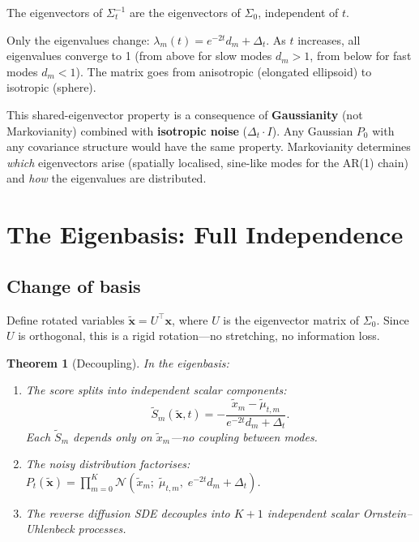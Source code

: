 \documentclass[11pt,a4paper]{article}
\newtheorem{theorem}{Theorem}[section]
\theoremstyle{definition}
\newcommand{\Dt}{\Delta_t}
\begin{document}
\begin{keybox}
The eigenvectors of $\Sigma_t^{-1}$ are the eigenvectors of $\Sigma_0$, independent of $t$.

Only the eigenvalues change: $\lambda_m(t) = e^{-2t}d_m + \Dt$.
As $t$ increases, all eigenvalues converge to 1 (from above for slow modes $d_m > 1$, from below for fast modes $d_m < 1$).
The matrix goes from anisotropic (elongated ellipsoid) to isotropic (sphere).

This shared-eigenvector property is a consequence of \textbf{Gaussianity} (not Markovianity) combined with \textbf{isotropic noise} ($\Dt\cdot I$).
Any Gaussian $P_0$ with any covariance structure would have the same property.
Markovianity determines \emph{which} eigenvectors arise (spatially localised, sine-like modes for the AR(1) chain) and \emph{how} the eigenvalues are distributed.
\end{keybox}


\section{The Eigenbasis: Full Independence}
\label{sec:eigenbasis}

\subsection{Change of basis}

Define rotated variables $\tilde{\mathbf{x}} = U^\top\mathbf{x}$, where $U$ is the eigenvector matrix of $\Sigma_0$.
Since $U$ is orthogonal, this is a rigid rotation---no stretching, no information loss.

\begin{theorem}[Decoupling]\label{thm:decouple}
In the eigenbasis:
\begin{enumerate}[label=(\roman*), nosep]
  \item The score splits into independent scalar components:
  \begin{equation}\label{eq:score-rot}
    \tilde{S}_m(\tilde{\mathbf{x}},t) = -\frac{\tilde{x}_m - \tilde{\mu}_{t,m}}{e^{-2t}d_m + \Dt}.
  \end{equation}
  Each $\tilde{S}_m$ depends only on $\tilde{x}_m$---no coupling between modes.
  \item The noisy distribution factorises: $P_t(\tilde{\mathbf{x}}) = \prod_{m=0}^K\mathcal{N}(\tilde{x}_m;\;\tilde{\mu}_{t,m},\;e^{-2t}d_m + \Dt)$.
  \item The reverse diffusion SDE decouples into $K+1$ independent scalar Ornstein--Uhlenbeck processes.
\end{enumerate}
\end{theorem}
\end{document}
